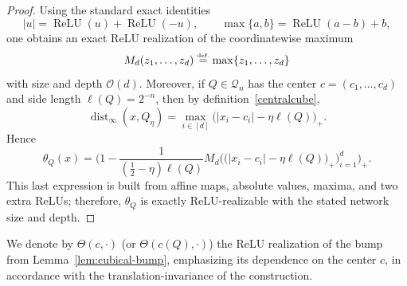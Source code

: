 \documentclass{article}
\newcommand{\eqdef }{\ensuremath{\stackrel{\mbox{\upshape\tiny def.}}{=}}}
\newcommand{\ReLU}{\operatorname{ReLU}}
\begin{document}
\begin{proof}
Using the standard exact identities
\[
|u|=\ReLU(u)+\ReLU(-u),
\qquad
\max\{a,b\}=\ReLU(a-b)+b,
\]
one obtains an exact ReLU realization of the coordinatewise maximum
\[
M_d(z_1,\dots,z_d)\eqdef \max\{z_1,\dots,z_d\}
\]
with size and depth $\mathcal O(d)$. 
Moreover, if $Q\in\mathcal Q_n$ has the center $c=(c_1,\dots,c_d)$ and
side length $\ell(Q)=2^{-n}$, then by definition~\eqref{centralcube},
\[
\operatorname{dist}_{\infty}(x,Q_\eta)
=
\max_{i\in[d]}\bigl(|x_i-c_i|-\eta\ell(Q)\bigr)_+.
\]
Hence
\[
\theta_Q(x)
=
\Bigg(
1-
\frac{1}{(\tfrac12-\eta)\ell(Q)}
M_d\Big(\bigl(|x_i-c_i|-\eta\ell(Q)\bigr)_+\Big)_{i=1}^d
\Bigg)_+.
\]
This last expression is built from affine maps, absolute values, maxima, and two extra ReLUs; %
therefore, $\theta_Q$ is exactly ReLU-realizable with the stated network size and depth. %
\end{proof}

We denote by $\Theta(c,\cdot)$ (or $\Theta(c(Q),\cdot)$) the ReLU realization of the bump from Lemma~\ref{lem:cubical-bump}, emphasizing its dependence on the center $c$, in accordance with the translation-invariance of the construction.
\end{document}
